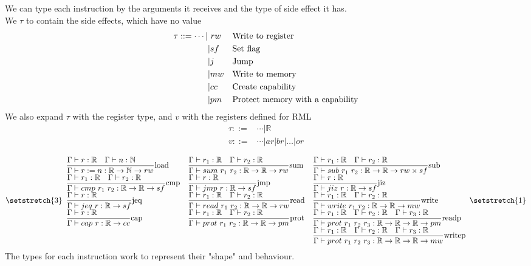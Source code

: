 \documentclass{article}
\newcommand{\mR}[0]{\ensuremath{\mathbb R}}
\begin{document}
We can type each instruction by the arguments it receives and the type of side effect it has.\\
We $\tau$ to contain the side effects, which have no value
\begin{align*}
    \tau ::= \cdots |&\ rw && \text{Write to register} \\
    &| sf && \text{Set flag} \\
    &| j  && \text{Jump} \\
    &| mw && \text{Write to memory} \\
    &| cc && \text{Create capability} \\
    &| pm && \text{Protect memory with a capability} \\
\end{align*}
We also expand $\tau$ with the register type, and $v$ with the registers defined for RML
\begin{align*}
    \tau ::=& \cdots | \mR \\
    v ::=& \cdots | ar|br|\dots|or
\end{align*}

\begin{align*}
    \setstretch{3}\begin{array}{lll}
        \st[load]{\Gamma\vdash r:=n: \mR\to\N\to rw}{\Gamma\vdash r:\mR \quad \Gamma\vdash n:\N} &
        \st[sum]{\Gamma\vdash sum\ r_1\ r_2: \mR\to\mR\to rw}{\Gamma\vdash r_1:\mR \quad \Gamma\vdash r_2:\mR} &
        \st[sub]{\Gamma\vdash sub\ r_1\ r_2: \mR\to\mR\to rw \times sf}{\Gamma\vdash r_1:\mR \quad \Gamma\vdash r_2:\mR} \\
        \st[cmp]{\Gamma\vdash cmp\ r_1\ r_2: \mR\to\mR\to sf}{\Gamma\vdash r_1:\mR \quad \Gamma\vdash r_2:\mR} &
        \st[jmp]{\Gamma\vdash jmp\ r: \mR\to sf}{\Gamma\vdash r:\mR} &
        \st[jiz]{\Gamma\vdash jiz\ r: \mR\to sf}{\Gamma\vdash r:\mR} \\
        \st[jeq]{\Gamma\vdash jeq\ r: \mR\to sf}{\Gamma\vdash r:\mR} &
        \st[read]{\Gamma\vdash read\ r_1\ r_2: \mR\to\mR\to rw}{\Gamma\vdash r_1:\mR \quad \Gamma\vdash r_2:\mR} &
        \st[write]{\Gamma\vdash write\ r_1\ r_2: \mR\to\mR\to mw}{\Gamma\vdash r_1:\mR \quad \Gamma\vdash r_2:\mR} \\
        \st[cap]{\Gamma\vdash cap\ r: \mR\to cc}{\Gamma\vdash r:\mR} &
        \st[prot]{\Gamma\vdash prot\ r_1\ r_2: \mR\to\mR\to pm}{\Gamma\vdash r_1:\mR \quad \Gamma\vdash r_2:\mR} &
        \st[readp]{\Gamma\vdash prot\ r_1\ r_2\ r_3: \mR\to\mR\to\mR\to pm}{\Gamma\vdash r_1:\mR \quad \Gamma\vdash r_2:\mR \quad \Gamma\vdash r_3:\mR} \\
                                                                                                                 &&\st[writep]{\Gamma\vdash prot\ r_1\ r_2\ r_3: \mR\to\mR\to\mR\to mw}{\Gamma\vdash r_1:\mR \quad \Gamma\vdash r_2:\mR \quad \Gamma\vdash r_3:\mR}
    \end{array}\setstretch{1}
\end{align*}
The types for each instruction work to represent their "shape" and behaviour.
\end{document}
